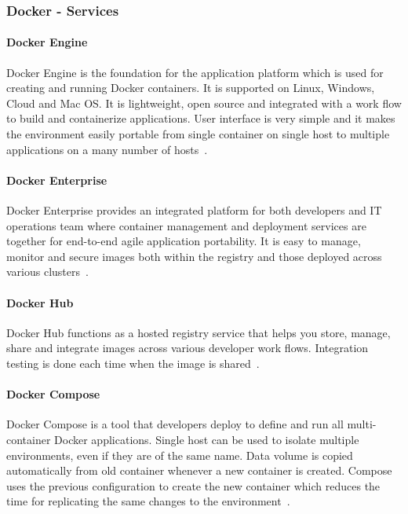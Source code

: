 	\subsubsection{Docker - Services}

	\paragraph{Docker Engine}
	Docker Engine is the foundation for the application platform
  which is used for creating and running Docker containers.
  It is supported on Linux, Windows, Cloud and Mac OS. It is
  lightweight, open source and integrated with a work flow
  to build and containerize applications. User interface is
  very simple and it makes the environment easily portable 
  from single container on single host to multiple applications
  on a many number of hosts~\cite{hackernoon}.
  
	\paragraph{Docker Enterprise}
	Docker Enterprise provides an integrated platform for both
  developers and IT operations team where container management and
  deployment services are together for end-to-end agile application
  portability. It is easy to manage, monitor and secure images both
  within the registry and those deployed across various
  clusters~\cite{hackernoon}.
  
	\paragraph{Docker Hub}
	Docker Hub functions as a hosted registry service that helps you
  store, manage, share and integrate images across various developer
  work flows. Integration testing is done each time when the image is
  shared~\cite{hackernoon}.
  
	\paragraph{Docker Compose}
	Docker Compose is a tool that developers deploy to define and run
  all multi-container Docker applications. Single host can be used to
  isolate multiple environments, even if they are of the same name.
  Data volume is copied automatically from old container whenever a
  new container is created. Compose uses the previous configuration to
  create the new container which reduces the time for replicating the
  same changes to the environment~\cite{hackernoon}.
	

